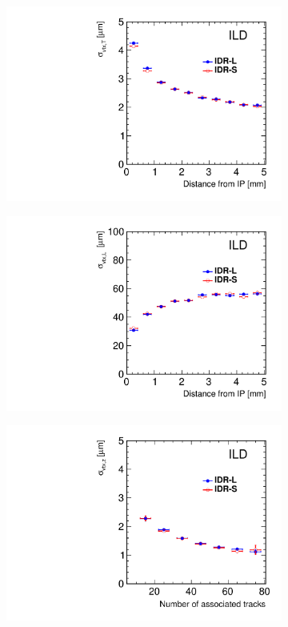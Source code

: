 \begin{figure}[htbp]
\begin{subfigure}{0.49\hsize}
 \includegraphics[width=\hsize]{Performance/fig/svtx_r_resol.pdf}
 \caption{ \label{fig:perf:svtx_r}}
 \end{subfigure}
\begin{subfigure}{0.49\hsize}
 \includegraphics[width=\hsize]{Performance/fig/svtx_z_resol.pdf}
 \caption{  \label{fig:perf:svtx_z}}
 \end{subfigure}
\begin{subfigure}{0.49\hsize}
 \includegraphics[width=\hsize]{Performance/fig/pvtx_z_resol.pdf}

\end{subfigure}
\end{figure}
